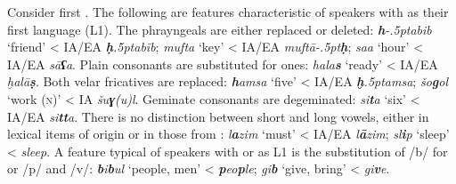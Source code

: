 \documentclass[output=paper]{langsci/langscibook}
\begin{document}
Consider first  . The following are features characteristic of speakers with  as their first language (L1). The phrayngeals are either replaced or deleted: \textit{\textbf{h}\kern -.5ptabib} ‘friend’ < IA/EA \textit{\textbf{ḥ}\kern .5ptabīb}; \textit{mufta} ‘key’ < IA/EA \textit{muftā\kern -.5pt\textbf{ḥ}}; \textit{saa} ‘hour’ < IA/EA \textit{sā\textbf{ʕ}a}. Plain consonants are substituted for  ones: \textit{hala\textbf{s}} ‘ready’ < IA/EA \textit{ḫalā\textbf{ṣ}}. Both velar fricatives are replaced: \textit{\textbf{h}amsa} ‘five’ < IA/EA \textit{\textbf{ḫ}\kern .5ptamsa}; \textit{šo\textbf{g}ol} ‘work (\textsc{n})’ < IA \textit{šu\textbf{ɣ}(u)l}. Geminate consonants are degeminated: \textit{si\textbf{t}a} ‘six’ < IA/EA \textit{si\textbf{tt}a}. There is no distinction between short and long vowels, either in lexical items of  origin or in those from : \textit{l\textbf{a}zim} ‘must’ < IA/EA \textit{l\textbf{ā}zim}; \textit{sl\textbf{i}p} ‘sleep’ <  \textit{sleep}. A feature typical of speakers with  or   as L1 is the substitution of /b/ for  or  /p/ and /v/: \textit{\textbf{b}i\textbf{b}ul} ‘people, men’ <  \textit{\textbf{p}eo\textbf{p}le}; \textit{gi\textbf{b}} ‘give, bring’ <  \textit{gi\textbf{v}e}.
\end{document}
